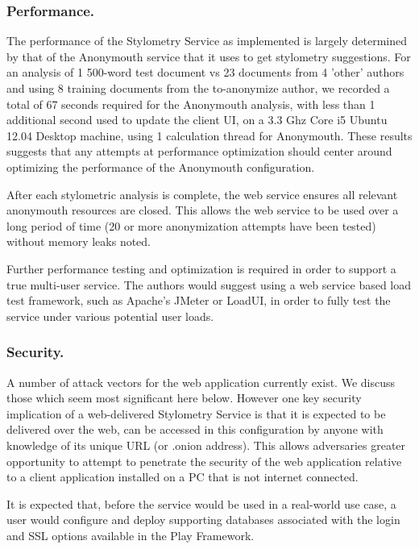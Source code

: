 \documentclass[letterpaper]{article}
\begin{document}
\subsubsection{Performance.}

The performance of the Stylometry Service as implemented is largely
determined by that of the Anonymouth service that it uses to get
stylometry suggestions. For an analysis of 1 500-word test document vs
23 documents from 4 'other' authors and using 8 training documents
from the to-anonymize author, we recorded a total of 67 seconds
required for the Anonymouth analysis, with less than 1 additional
second used to update the client UI, on a 3.3 Ghz Core i5 Ubuntu 12.04
Desktop machine, using 1 calculation thread for Anonymouth. These results suggests that any attempts at
performance optimization should center around optimizing the
performance of the Anonymouth configuration.

After each stylometric analysis is complete, the web service ensures
all relevant anonymouth resources are closed. This allows the web
service to be used over a long period of time (20 or more
anonymization attempts have been tested) without memory leaks noted.

Further performance testing and optimization is required in order to support a true
multi-user service. The authors would suggest using a web service
based load test framework, such as Apache's JMeter or LoadUI, in order
to fully test the service under various potential user loads.

\subsubsection{Security.}

A number of attack vectors for the web application currently exist. We
discuss those which seem most significant here below. However one key
security implication of a web-delivered Stylometry Service is that it
is expected to be delivered over the web, can be accessed in this configuration by anyone with knowledge of its unique URL (or .onion
address). This allows adversaries greater opportunity to attempt to
penetrate the security of the web application relative to a client
application installed on a PC that is not internet connected.

It is expected that, before the service would be used in a real-world
use case, a user would configure and deploy supporting databases
associated with the login and SSL options available in the
Play Framework.
\end{document}
